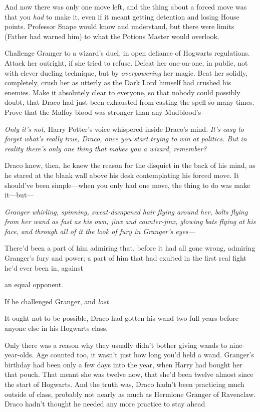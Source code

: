 And now there was only one move left, and the thing about a forced move was
that you \emph{had} to make it, even if it meant getting detention and losing
House points. Professor Snape would know and understand, but there were limits
(Father had warned him) to what the Potions Master would overlook.

Challenge Granger to a wizard's duel, in open defiance of Hogwarts regulations.
Attack her outright, if she tried to refuse. Defeat her one-on-one, in public,
not with clever dueling technique, but by \emph{overpowering} her magic. Beat
her solidly, completely, crush her as utterly as the Dark Lord himself had
crushed his enemies. Make it absolutely clear to everyone, so that nobody could
possibly doubt, that Draco had just been exhausted from casting the spell so
many times. Prove that the Malfoy blood was stronger than any Mudblood's---

\emph{Only it's not,} Harry Potter's voice whispered inside Draco's mind.
\emph{It's easy to forget what's really true, Draco, once you start trying to
win at politics. But in reality there's only one thing that makes you a wizard,
remember?}

Draco knew, then, he knew the reason for the disquiet in the back of his mind,
as he stared at the blank wall above his desk contemplating his forced move. It
should've been simple---when you only had one move, the thing to do was make
it---but---

\emph{Granger whirling, spinning, sweat-dampened hair flying around her, bolts
flying from her wand as fast as his own, jinx and counter-jinx, glowing bats
flying at his face, and through all of it the look of fury in Granger's eyes---}

There'd been a part of him admiring that, before it had all gone wrong,
admiring Granger's fury and power; a part of him that had exulted in the first
real fight he'd ever been in, against{\el}

{\el} an equal opponent.

If he challenged Granger, and \emph{lost{\el}}

It ought not to be possible, Draco had gotten his wand two full years before
anyone else in his Hogwarts class.

Only there was a reason why they usually didn't bother giving wands to
nine-year-olds. Age counted too, it wasn't just how long you'd held a wand.
Granger's birthday had been only a few days into the year, when Harry had
bought her that pouch. That meant she was twelve now, that she'd been twelve
almost since the start of Hogwarts. And the truth was, Draco hadn't been
practicing much outside of class, probably not nearly as much as Hermione
Granger of Ravenclaw. Draco hadn't thought he needed any more practice to stay
ahead{\el}

